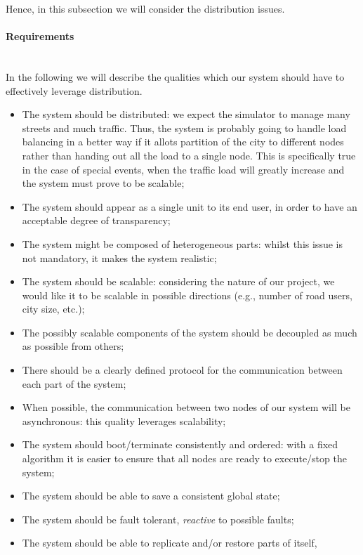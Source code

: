 Hence, in this subsection we will consider the distribution issues.

\paragraph{Requirements} \mbox{} \\

In the following we will describe the qualities which our system should have to
effectively leverage distribution.

\begin{itemize}
\item The system should be distributed: we expect the simulator to manage many
  streets and much traffic. Thus, the system is probably going to handle load
  balancing in a better way if it allots partition of the city to different
  nodes rather than handing out all the load to a single node. This is
  specifically true in the case of special events, when the traffic load will
  greatly increase and the system must prove to be scalable;
\item The system should appear as a single unit to its end user, in order to
  have an acceptable degree of transparency;
\item The system might be composed of heterogeneous parts: whilst this issue
  is not mandatory, it makes the system realistic;
\item The system should be scalable: considering the nature of our project,
we would like it to be scalable in possible directions
  (e.g., number of road users, city size, etc.);
\item The possibly scalable components of the system should be decoupled as
  much as possible from others;
\item There should be a clearly defined protocol for the communication between
  each part of the system;
\item When possible, the communication between two nodes of our system will be
  asynchronous: this quality leverages scalability;
\item The system should boot/terminate consistently and ordered: with a fixed
  algorithm it is easier to ensure that all nodes are ready to execute/stop the
  system;
\item The system should be able to save a consistent global state;
\item The system should be fault tolerant, \emph{reactive} to possible faults;
\item The system should be able to replicate and/or restore parts of itself,

\end{itemize}

